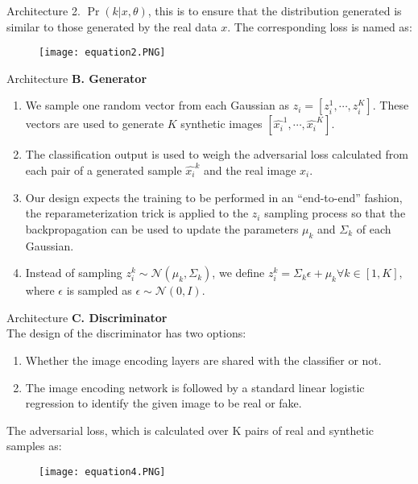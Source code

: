 \documentclass{beamer}
\providecommand{\pr}[1]{\ensuremath{\Pr\left(#1\right)}}
\begin{document}
\begin{frame}{Architecture}
2. $\pr{k|x,\theta}$, this is to ensure that the distribution generated is similar to those generated by the real data $x$. The corresponding loss is named as:
\begin{figure}[!tbp]
  \centering
  {\texttt{[image: equation2.PNG]}}
  \hfill
\end{figure}

\end{frame}




\begin{frame}{Architecture}
 \textbf{B. Generator\\} 
 \begin{enumerate}[]
 \item We sample one random vector from each Gaussian as $z_i = [z_{i}^{1},\cdots, z_{i}^{K}]$. These vectors are used to generate $K$ synthetic images $[\hat{x_i}^{1},\cdots,\hat{x_i}^{K} ]$. 
 \item The classification output is used to weigh the adversarial loss calculated from each pair of a generated sample $\hat{x_i}^{k}$ and the real image $x_i$.
 \item Our design expects the training to be performed in an ``end-to-end” fashion, the reparameterization trick is applied to the $z_i$ sampling process so that the backpropagation can be used to update the parameters $\mu_k$ and
$\Sigma_k$ of each Gaussian.
\item Instead of sampling $z_{i}^{k} \sim \mathcal{N}(\mu_k,\Sigma_k)$, we define $z_{i}^{k} = \Sigma_k\epsilon + \mu_k \forall k \in [1, K],$ where $\epsilon$ is sampled as $\epsilon \sim \mathcal{N}(0, I)$.
 \end{enumerate}
\end{frame}



\begin{frame}{Architecture}
\textbf{C. Discriminator\\}
The design of the discriminator has two options:
\begin{enumerate}
\item Whether the image encoding layers are shared with the classifier or not.
\item The image encoding network is followed by a standard linear logistic regression to identify the given image to be real or fake.
\end{enumerate}
The adversarial loss, which is calculated over K pairs
of real and synthetic samples as:
\begin{figure}[!tbp]
  \centering
  {\texttt{[image: equation4.PNG]}}
  \hfill
\end{figure}
\end{frame}
\end{document}
